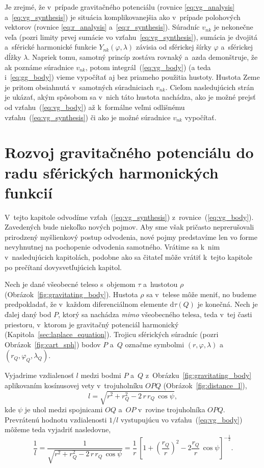 \documentclass[a4paper,12pt]{book}
\newcommand{\diff}{\mathrm d}
\begin{document}
Je zrejmé, že v~prípade gravitačného potenciálu (rovnice \ref{eq:vg_analysis}
a~\ref{eq:vg_synthesis}) je situácia komplikovanejšia ako v~prípade polohových
vektorov (rovnice \ref{eq:r_analysis} a~\ref{eq:r_synthesis}).  Súradníc
$v_{nk}$ je nekonečne veľa (pozri limity prvej sumácie vo
vzťahu~\ref{eq:vg_synthesis}), sumácia je dvojitá a~sférické harmonické funkcie
$Y_{nk}(\varphi, \lambda)$ závisia od sférickej šírky $\varphi$ a~sférickej
dĺžky $\lambda$.  Napriek tomu, samotný princíp zostáva rovnaký a~azda
demonštruje, že ak poznáme súradnice $v_{nk}$, potom
integrál~(\ref{eq:vg_body}) (a teda i~\ref{eq:gg_body}) vieme vypočítať aj bez
priameho použitia hustoty.  Hustota Zeme je pritom obsiahnutá v~samotných
súradniciach $v_{nk}$.  Cieľom nasledujúcich strán je ukázať, akým spôsobom sa
v~nich táto hustota nachádza, ako je možné prejsť od vzťahu~(\ref{eq:vg_body})
až k~formálne veľmi odlišnému vzťahu~(\ref{eq:vg_synthesis}) či ako je možné
súradnice $v_{nk}$ vypočítať.



\section{Rozvoj gravitačného potenciálu do radu sférických harmonických
funkcií}
\label{sec:vg_sh_expansion}

V~tejto kapitole odvodíme vzťah~(\ref{eq:vg_synthesis})
z~rovnice~(\ref{eq:vg_body}).  Zavedených bude niekoľko nových pojmov.  Aby sme
však pričasto neprerušovali prirodzený myšlienkový postup odvodenia, nové pojmy
predstavíme len vo forme nevyhnutnej na pochopenie odvodenia samotného.
Vrátime sa k~nim v~nasledujúcich kapitolách, podobne ako sa čitateľ môže vrátiť
k~tejto kapitole po prečítaní dovysvetľujúcich kapitol.

Nech je dané všeobecné teleso s~objemom $\tau$ a~hustotou $\rho$
(Obrázok~\ref{fig:gravitating_body}).  Hustota $\rho$ sa v~telese môže meniť,
no budeme predpokladať, že v~každom diferenciálnom elemente $\diff \tau(Q)$ je
konečná.  Nech je ďalej daný bod $P$, ktorý sa nachádza \emph{mimo} všeobecného
telesa, teda v~tej časti priestoru, v~ktorom je gravitačný potenciál harmonický
(Kapitola~\ref{sec:laplace_equation}).  Trojicu sférických súradníc (pozri
Obrázok~\ref{fig:cart_sph}) bodov $P$ a~$Q$ označme symbolmi $(r, \varphi,
\lambda)$ a~$(r_Q, \varphi_Q, \lambda_Q)$.

Vyjadrime vzdialenosť $l$ medzi bodmi $P$ a~$Q$
z~Obrázku~\ref{fig:gravitating_body} aplikovaním kosínusovej vety
v~trojuholníku $OPQ$ (Obrázok~\ref{fig:distance_l}),
%
\begin{equation}
l = \sqrt{r^2 + r_Q^2 - 2 \, r \, r_Q \, \cos\psi}{,}
\end{equation}
%
kde $\psi$ je uhol medzi spojnicami $OQ$ a~$OP$ v~rovine trojuholníka $OPQ$.
Prevrátenú hodnotu vzdialenosti $1 \slash l$ vystupujúcu vo
vzťahu~(\ref{eq:vg_body}) môžeme teda vyjadriť nasledovne,
%
\begin{equation}
\label{eq:1l}
\frac{1}{l} = \frac{1}{\sqrt{ r^2 + r_Q^2 - 2 \, r \, r_Q \, \cos\psi
}} = \frac{1}{r} \, \left[1 + \left( \dfrac{r_Q}{r}
\right)^2 - 2 \dfrac{r_Q}{r} \, \cos\psi \right]^{-\frac{1}{2}}{.}
\end{equation}
\end{document}
